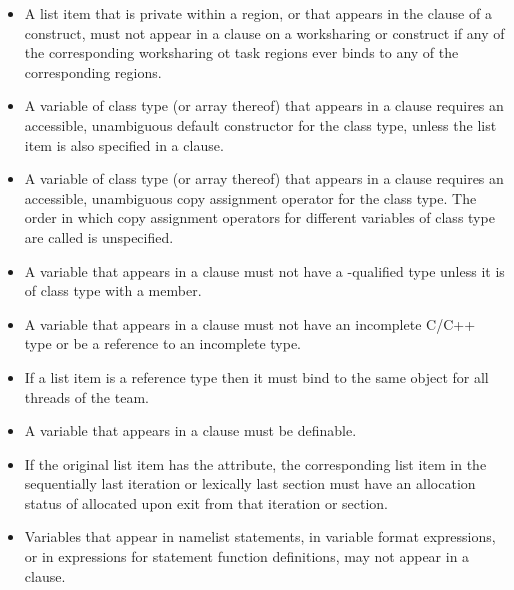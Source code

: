 \begin{itemize}
\item A list item that is private within a  region, or
that appears in the  clause of a 
construct, must not appear in a  clause on a
worksharing or  construct if any of the corresponding
worksharing ot task regions ever binds to any of the corresponding
 regions.

\cppspecificstart
\item A variable of class type (or array thereof) that appears in a  clause 
requires an accessible, unambiguous default constructor for the class type, unless the 
list item is also specified in a  clause. 

\item A variable of class type (or array thereof) that appears in a  clause 
requires an accessible, unambiguous copy assignment operator for the class type. The 
order in which copy assignment operators for different variables of class type are 
called is unspecified.
\cppspecificend

\ccppspecificstart
\item A variable that appears in a  clause must not have a -qualified 
type unless it is of class type with a  member. 

\item A variable that appears in a  clause must not have an incomplete C/C++ type or be a reference to an incomplete type.
\item If a list item is a reference type then it must bind to the same object for all threads of the team. 
\ccppspecificend

\fortranspecificstart
\item A variable that appears in a  clause must be definable.

\item If the original list item has the  attribute, the corresponding list item in the sequentially last iteration or lexically last section must have an allocation status of allocated upon exit from that iteration or section.

\item Variables that appear in namelist statements, in variable format expressions, or in 
expressions for statement function definitions, may not appear in a  
clause.
\fortranspecificend
\end{itemize}











